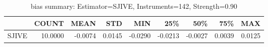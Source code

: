 \begin{table}[ht]
\centering
\caption{bias summary: Estimator=SJIVE, Instruments=142, Strength=0.90}
\begin{tabular}{lrrrrrrrr}
\toprule
 & COUNT & MEAN & STD & MIN & 25\% & 50\% & 75\% & MAX \\
\midrule
SJIVE & 10.0000 & -0.0074 & 0.0145 & -0.0290 & -0.0213 & -0.0027 & 0.0039 & 0.0125 \\
\bottomrule
\end{tabular}
\end{table}
